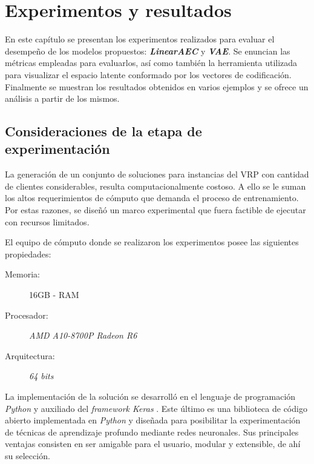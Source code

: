 \chapter{Experimentos y resultados}\label{chapter:Results}

En este capítulo se presentan los experimentos realizados para evaluar el desempeño de los modelos propuestos: \textit{\textbf{LinearAEC}} y \textit{\textbf{VAE}}.  Se enuncian las métricas empleadas para evaluarlos, así como también la herramienta utilizada para visualizar el espacio latente conformado por los vectores de codificación. Finalmente se muestran los resultados obtenidos en varios ejemplos y se ofrece un análisis a partir de los mismos.

\section{Consideraciones de la etapa de experimentación}\label{4-Consideraciones}

La generación de un conjunto de soluciones para instancias del VRP con cantidad de clientes considerables, resulta computacionalmente costoso. A ello se le suman los altos requerimientos de cómputo que demanda el proceso de entrenamiento. Por estas razones, se diseñó un marco experimental que fuera factible de ejecutar con recursos limitados.

El equipo de cómputo donde se realizaron los experimentos posee las siguientes propiedades:

\begin{description}
	\item[Memoria:] 16GB - RAM
	\item[Procesador:] \textit{AMD A10-8700P Radeon R6}
	\item[Arquitectura:] \textit{64 bits} 
\end{description}

La implementación de la solución se desarrolló en el lenguaje de programación \textit{Python} y auxiliado del \textit{framework Keras} \cite{keras}. Este último es una biblioteca de código abierto implementada en \textit{Python} y diseñada para posibilitar la experimentación de técnicas de aprendizaje profundo mediante redes neuronales. Sus principales ventajas consisten en ser amigable para el usuario, modular y extensible, de ahí su selección.

